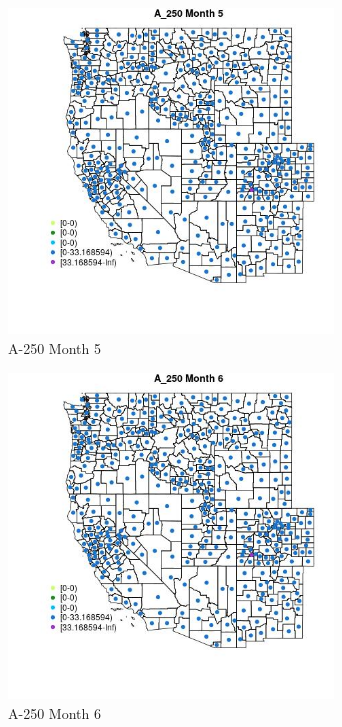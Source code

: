 \begin{figure} 
\centering  
\includegraphics[width=0.77\textwidth]{Code_Outputs/df_report_ML_predictors_CountyCentroid_Locations_Dates_2008-01-01to2018-12-31_MapObsMo5A_250.jpg} 
\caption{\label{fig:df_report_ML_predictors_CountyCentroid_Locations_Dates_2008-01-01to2018-12-31MapObsMo5A_250}A-250 Month 5} 
\end{figure} 
 

\clearpage 

\begin{figure} 
\centering  
\includegraphics[width=0.77\textwidth]{Code_Outputs/df_report_ML_predictors_CountyCentroid_Locations_Dates_2008-01-01to2018-12-31_MapObsMo6A_250.jpg} 
\caption{\label{fig:df_report_ML_predictors_CountyCentroid_Locations_Dates_2008-01-01to2018-12-31MapObsMo6A_250}A-250 Month 6} 
\end{figure} 
 

